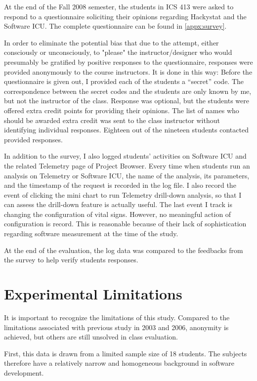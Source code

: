 At the end of the Fall 2008 semester, the students in ICS 413 were asked to respond to a questionnaire soliciting their opinions regarding Hackystat and the Software ICU. The complete questionnaire can be found in \autoref{appx:survey}. 

In order to eliminate the potential bias that due to the attempt, either consciously or unconsciously, to "please" the instructor/designer who would presumably be gratified by positive responses to the questionnaire, responses were provided anonymously to the course instructors. It is done in this way: Before the questionnaire is given out, I provided each of the students a ``secret'' code. The correspondence between the secret codes and the students are only known by me, but not the instructor of the class. Response was optional, but the students were offered extra credit points for providing their opinions. The list of names who should be awarded extra credit was sent to the class instructor without identifying individual responses. Eighteen out of the nineteen students contacted provided responses. 

In addition to the survey, I also logged students' activities on Software ICU and the related Telemetry page of Project Browser. Every time when students run an analysis on Telemetry or Software ICU, the name of the analysis, its parameters, and the timestamp of the request is recorded in the log file. I also record the event of clicking the mini chart to run Telemetry drill-down analysis, so that I can assess the drill-down feature is actually useful. The last event I track is changing the configuration of vital signs. However, no meaningful action of configuration is record. This is reasonable because of their lack of sophistication regarding software measurement at the time of the study.

At the end of the evaluation, the log data was compared to the feedbacks from the survey to help verify students responses.

\section {Experimental Limitations}

It is important to recognize the limitations of this study. Compared to the limitations associated with previous study in 2003 and 2006, anonymity is achieved, but others are still unsolved in class evaluation.

First, this data is drawn from a limited sample size of 18 students. The subjects therefore have a relatively narrow and homogeneous background in software development.

